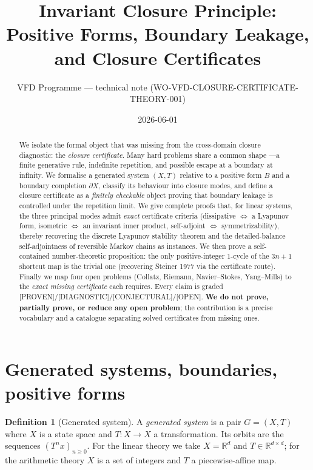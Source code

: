 \documentclass[11pt]{article}
\title{\textbf{Invariant Closure Principle:\\ Positive Forms, Boundary Leakage, and Closure Certificates}}
\author{VFD Programme --- technical note (WO-VFD-CLOSURE-CERTIFICATE-THEORY-001)}
\date{2026-06-01}
\theoremstyle{definition}
\newtheorem{definition}{Definition}
\theoremstyle{plain}
\theoremstyle{remark}
\newcommand{\PROVEN}{\textcolor{green!45!black}{\textsf{[PROVEN]}}}
\newcommand{\DIAG}{\textcolor{blue!55!black}{\textsf{[DIAGNOSTIC]}}}
\newcommand{\CONJ}{\textcolor{orange!75!black}{\textsf{[CONJECTURAL]}}}
\newcommand{\OPEN}{\textcolor{red!65!black}{\textsf{[OPEN]}}}
\begin{document}
\maketitle

\begin{abstract}
We isolate the formal object that was missing from the cross-domain closure
diagnostic: the \emph{closure certificate}. Many hard problems share a common shape
---a finite generative rule, indefinite repetition, and possible escape at a boundary
at infinity. We formalise a generated system $(X,T)$ relative to a positive form $B$
and a boundary completion $\partial X$, classify its behaviour into closure modes, and
define a closure certificate as a \emph{finitely checkable} object proving that boundary
leakage is controlled under the repetition limit. We give complete proofs that, for
linear systems, the three principal modes admit \emph{exact} certificate criteria
(dissipative $\Leftrightarrow$ a Lyapunov form, isometric $\Leftrightarrow$ an invariant
inner product, self-adjoint $\Leftrightarrow$ symmetrizability), thereby recovering the
discrete Lyapunov stability theorem and the detailed-balance self-adjointness of
reversible Markov chains as instances. We then prove a self-contained number-theoretic
proposition: the only positive-integer $1$-cycle of the $3n{+}1$ shortcut map is the
trivial one (recovering Steiner 1977 via the certificate route). Finally we map four
open problems (Collatz, Riemann, Navier--Stokes, Yang--Mills) to the \emph{exact missing
certificate} each requires. Every claim is graded
\PROVEN/\DIAG/\CONJ/\OPEN. \textbf{We do not prove, partially prove, or reduce any open
problem}; the contribution is a precise vocabulary and a catalogue separating solved
certificates from missing ones.
\end{abstract}

\section{Generated systems, boundaries, positive forms}

\begin{definition}[Generated system]\label{def:gs}
A \emph{generated system} is a pair $G=(X,T)$ where $X$ is a state space and
$T\colon X\to X$ a transformation. Its orbits are the sequences $(T^n x)_{n\ge 0}$.
For the linear theory we take $X=\mathbb R^d$ and $T\in\mathbb R^{d\times d}$;
for the arithmetic theory $X$ is a set of integers and $T$ a piecewise-affine map.
\end{definition}
\end{document}
